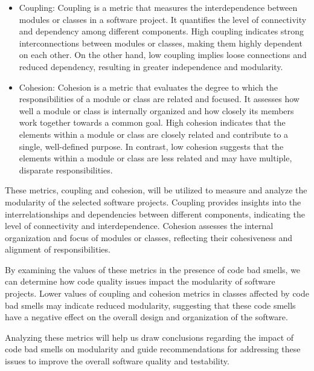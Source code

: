 \documentclass[conference]{IEEEtran}
\begin{document}
	\begin{itemize}
		\item Coupling: Coupling is a metric that measures the interdependence between modules or classes in a software project. It quantifies the level of connectivity and dependency among different components. High coupling indicates strong interconnections between modules or classes, making them highly dependent on each other. On the other hand, low coupling implies loose connections and reduced dependency, resulting in greater independence and modularity.
		\item Cohesion: Cohesion is a metric that evaluates the degree to which the responsibilities of a module or class are related and focused. It assesses how well a module or class is internally organized and how closely its members work together towards a common goal. High cohesion indicates that the elements within a module or class are closely related and contribute to a single, well-defined purpose. In contrast, low cohesion suggests that the elements within a module or class are less related and may have multiple, disparate responsibilities.
	\end{itemize}

	These metrics, coupling and cohesion, will be utilized to measure and analyze the modularity of the selected software projects. Coupling provides insights into the interrelationships and dependencies between different components, indicating the level of connectivity and interdependence. Cohesion assesses the internal organization and focus of modules or classes, reflecting their cohesiveness and alignment of responsibilities.
	
	By examining the values of these metrics in the presence of code bad smells, we can determine how code quality issues impact the modularity of software projects. Lower values of coupling and cohesion metrics in classes affected by code bad smells may indicate reduced modularity, suggesting that these code smells have a negative effect on the overall design and organization of the software.
	
	Analyzing these metrics will help us draw conclusions regarding the impact of code bad smells on modularity and guide recommendations for addressing these issues to improve the overall software quality and testability.
	
\end{document}
